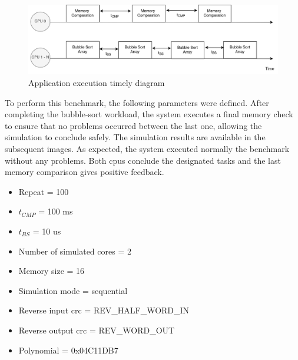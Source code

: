 \begin{figure}[H]
	\centering
 	\includegraphics[width=0.8\linewidth]{Images/AppTimeDiagram.png}
 	\caption{Application execution timely diagram}
	 \label{fig_AppTimeDiagram}
\end{figure}


To perform this benchmark, the following parameters were defined. After completing the bubble-sort workload, the system executes a final 
memory check to ensure that no problems occurred between the last one, allowing the simulation to conclude safely. The simulation results are 
available in the subsequent images. As expected, the system executed normally the benchmark without any problems. Both \glspl{cpu} conclude the 
designated tasks and the last memory comparison gives positive feedback. 

\hspace{1.5cm}

\begin{multicols}{2}
	
	\begin{itemize}
		\item Repeat = 100
		\item $t_{CMP}$ = 100 ms
		\item $t_{BS}$ = 10 us
		\item Number of simulated cores = 2
		\item Memory size = 16
	\end{itemize}

	\columnbreak

	\begin{itemize}
		\item Simulation mode = sequential
		\item Reverse input \gls{crc} = REV\_HALF\_WORD\_IN
		\item Reverse output \gls{crc} = REV\_WORD\_OUT
		\item Polynomial = 0x04C11DB7
	\end{itemize}

\end{multicols}


